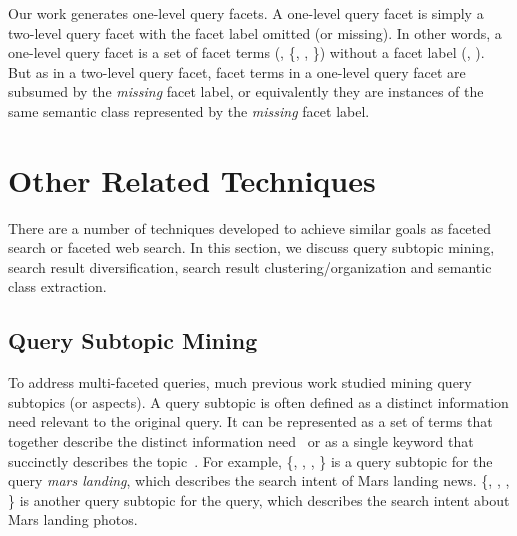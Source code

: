 Our work generates one-level query facets. A one-level query facet is simply a two-level query facet with the facet label omitted (or missing). In other words, a one-level query facet is a set of facet terms (\eg, \{, , \}) without a facet label (\eg, ). But as in a two-level query facet, facet terms in a one-level query facet are subsumed by the \textit{missing} facet label, or equivalently they are instances of the same semantic class represented by the \textit{missing} facet label.

\section{Other Related Techniques}
\label{sec:bg-others}
There are a number of techniques developed to achieve similar goals as faceted search or faceted web search. In this section, we discuss query subtopic mining, search result diversification, search result clustering/organization and semantic class extraction.

\subsection{Query Subtopic Mining}
To address multi-faceted queries, much previous work studied mining query subtopics (or aspects). A query subtopic is often defined as a distinct information need relevant to the original query. It can be represented as a set of terms that together describe the distinct information need~\cite{wang2009mining,wu2011identifying, dang2011inferring} or as a single keyword that succinctly describes the topic~\cite{song2011overview}. For example, \{, , , \} is a query subtopic for the query \textit{mars landing}, which describes the search intent of Mars landing news. \{, , , \} is another query subtopic for the query, which describes the search intent about Mars landing photos.

